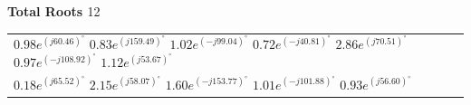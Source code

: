 \begin{center}
{ \bf{ Total Roots } } 12 \\ 
\begin{tabular}{ | p{16cm} | }
 \hline $0.98e^{(j60.46)^\circ}$ $0.83e^{(j159.49)^\circ}$ $1.02e^{(-j99.04)^\circ}$ $0.72e^{(-j40.81)^\circ}$ $2.86e^{(j70.51)^\circ}$ $0.97e^{(-j108.92)^\circ}$ $1.12e^{(j53.67)^\circ}$ \\ 
$0.18e^{(j65.52)^\circ}$ $2.15e^{(j58.07)^\circ}$ $1.60e^{(-j153.77)^\circ}$ $1.01e^{(-j101.88)^\circ}$ $0.93e^{(j56.60)^\circ}$ \\ \hline 
 \end{tabular}
\end{center}
